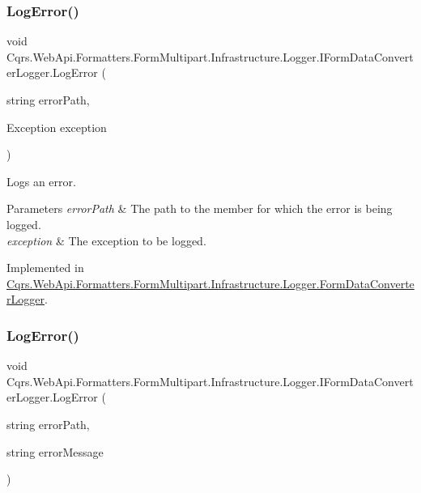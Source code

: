 \subsubsection{\texorpdfstring{Log\+Error()}{LogError()}\hspace{0.1cm}{\footnotesize\ttfamily [1/2]}}
{\footnotesize\ttfamily void Cqrs.\+Web\+Api.\+Formatters.\+Form\+Multipart.\+Infrastructure.\+Logger.\+I\+Form\+Data\+Converter\+Logger.\+Log\+Error (\begin{DoxyParamCaption}\item[{string}]{error\+Path,  }\item[{Exception}]{exception }\end{DoxyParamCaption})}



Logs an error. 


\begin{DoxyParams}{Parameters}
{\em error\+Path} & The path to the member for which the error is being logged.\\
\hline
{\em exception} & The exception to be logged.\\
\hline
\end{DoxyParams}


Implemented in \hyperlink{classCqrs_1_1WebApi_1_1Formatters_1_1FormMultipart_1_1Infrastructure_1_1Logger_1_1FormDataConverterLogger_ab54b4f24cc7ee7eacddbb9900a832ca3_ab54b4f24cc7ee7eacddbb9900a832ca3}{Cqrs.\+Web\+Api.\+Formatters.\+Form\+Multipart.\+Infrastructure.\+Logger.\+Form\+Data\+Converter\+Logger}.

\mbox{\label{interfaceCqrs_1_1WebApi_1_1Formatters_1_1FormMultipart_1_1Infrastructure_1_1Logger_1_1IFormDataConverterLogger_a0067054a5f882d2687e8fd9f9ae38e9b_a0067054a5f882d2687e8fd9f9ae38e9b}} 
\subsubsection{\texorpdfstring{Log\+Error()}{LogError()}\hspace{0.1cm}{\footnotesize\ttfamily [2/2]}}
{\footnotesize\ttfamily void Cqrs.\+Web\+Api.\+Formatters.\+Form\+Multipart.\+Infrastructure.\+Logger.\+I\+Form\+Data\+Converter\+Logger.\+Log\+Error (\begin{DoxyParamCaption}\item[{string}]{error\+Path,  }\item[{string}]{error\+Message }\end{DoxyParamCaption})}



